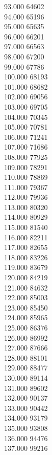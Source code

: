 { 93.000	64602 \\
 94.000	65196 \\
 95.000	65635 \\
 96.000	66201 \\
 97.000	66563 \\
 98.000	67200 \\
 99.000	67786 \\
 100.000	68193 \\
 101.000	68682 \\
 102.000	69056 \\
 103.000	69705 \\
 104.000	70345 \\
 105.000	70781 \\
 106.000	71241 \\
 107.000	71686 \\
 108.000	77925 \\
 109.000	78291 \\
 110.000	78869 \\
 111.000	79367 \\
 112.000	79936 \\
 113.000	80320 \\
 114.000	80929 \\
 115.000	81540 \\
 116.000	82211 \\
 117.000	82655 \\
 118.000	83226 \\
 119.000	83679 \\
 120.000	84219 \\
 121.000	84632 \\
 122.000	85003 \\
 123.000	85450 \\
 124.000	85965 \\
 125.000	86376 \\
 126.000	86992 \\
 127.000	87666 \\
 128.000	88101 \\
 129.000	88477 \\
 130.000	89114 \\
 131.000	89602 \\
 132.000	90137 \\
 133.000	90442 \\
 134.000	93179 \\
 135.000	93808 \\
 136.000	94476 \\
 137.000	99216 \\
}
